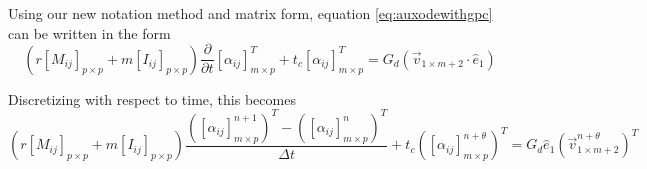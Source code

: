 \documentclass[12pt,letterpaper]{article}
\newcommand{\pd}[2]{\frac{\partial#1}{\partial#2}}
\newcommand{\m}[3]{\left[#1_{ij}\right]_{#2\times #3}}
\newcommand{\mt}[4]{\left(\left[#1_{ij}\right]_{#2\times #3}^{#4}\right)^T}
\newcommand{\vt}[4]{\left(\vec{#1}_{#2\times #3}^{#4}\right)^T}
\begin{document}
Using our new notation method and matrix form, equation
\eqref{eq:auxodewithgpc} can be written in the form
\begin{equation} \label{eq:matrixizedauxodewithgpc}
(r\m{M}{p}{p} + m\m{I}{p}{p}) \pd{}{t} \m{\alpha}{m}{p}^T +
t_c \m{\alpha}{m}{p}^T = G_d \left(\vec{v}_{1\times m+2} \cdot
\hat{e}_1\right)
\end{equation}

Discretizing with respect to time, this becomes
\begin{equation} \label{eq:discretizedauxodewithgpc}
(r\m{M}{p}{p} + m\m{I}{p}{p}) \frac{\mt{\alpha}{m}{p}{n+1} - \mt{\alpha}{m}{p}{n}}{\Delta t} + t_c \mt{\alpha}{m}{p}{n+\theta} = G_d \hat{e}_1 
\vt{v}{1}{m+2}{n+\theta}
\end{equation}
\end{document}
